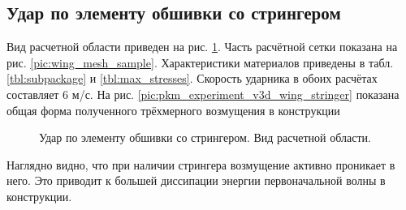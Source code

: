 \clearpage
\newpage


\subsection{Удар по элементу обшивки со стрингером}

Вид расчетной области приведен на рис. \ref{pic:wing_stringer_scene}. Часть расчётной сетки показана на рис. \ref{pic:wing_mesh_sample}. Характеристики материалов приведены в табл. \ref{tbl:subpackage} и \ref{tbl:max_stresses}. Скорость ударника в обоих расчётах составляет 6 м/с. На рис. \ref{pic:pkm_experiment_v3d_wing_stringer} показана общая форма полученного трёхмерного возмущения в конструкции

\begin{figure}[htp]
\caption{Удар по элементу обшивки со стрингером. Вид расчетной области.}
\label{pic:wing_stringer_scene}
\end{figure}

Наглядно видно, что при наличии стрингера возмущение активно проникает в него. Это приводит к большей диссипации энергии первоначальной волны в конструкции.

